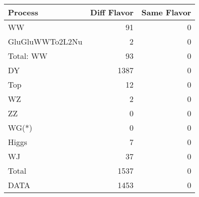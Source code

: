 \begin{table}[ht]
	\centering
\begin{tabular}{lrr}

         Process &  Diff Flavor &  Same Flavor \\
		\hline
              WW &           91 &            0 \\
 GluGluWWTo2L2Nu &            2 &            0 \\
\hline
       Total: WW &           93 &            0 \\
              DY &         1387 &            0 \\
             Top &           12 &            0 \\
              WZ &            2 &            0 \\
              ZZ &            0 &            0 \\
           WG(*) &            0 &            0 \\
           Higgs &            7 &            0 \\
              WJ &           37 &            0 \\
\hline
           Total &         1537 &            0 \\
            DATA &         1453 &            0 \\


\end{tabular}

\end{table}